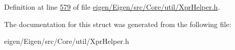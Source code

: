 Definition at line \hyperlink{eigen_2_eigen_2src_2_core_2util_2_xpr_helper_8h_source_l00579}{579} of file \hyperlink{eigen_2_eigen_2src_2_core_2util_2_xpr_helper_8h_source}{eigen/\+Eigen/src/\+Core/util/\+Xpr\+Helper.\+h}.



The documentation for this struct was generated from the following file\+:\begin{DoxyCompactItemize}
\item 
eigen/\+Eigen/src/\+Core/util/\+Xpr\+Helper.\+h\end{DoxyCompactItemize}
